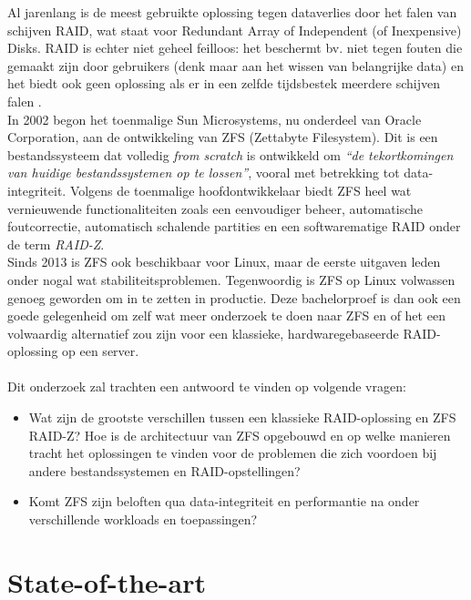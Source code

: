 \documentclass[fleqn,10pt]{voorstel}
\begin{document}
Al jarenlang is de meest gebruikte oplossing tegen dataverlies door het falen van schijven  RAID, wat staat voor Redundant Array of Independent (of Inexpensive) Disks. RAID is echter niet geheel feilloos: het beschermt bv. niet tegen fouten die gemaakt zijn door gebruikers (denk maar aan het wissen van belangrijke data) en het biedt ook geen oplossing als er in een zelfde tijdsbestek meerdere schijven falen \autocite{PeterM.Chen1993}. \\
In 2002 begon het toenmalige Sun Microsystems, nu onderdeel van Oracle Corporation, aan de ontwikkeling van ZFS (Zettabyte Filesystem). Dit is een bestandssysteem dat volledig \textit{from scratch} is ontwikkeld om \textit{``de tekortkomingen van huidige bestandssystemen op te lossen''}\autocite{JeffBonwick_lastZFS}, vooral met betrekking tot data-integriteit. Volgens de toenmalige hoofdontwikkelaar \textcite{ZFSBonwick} biedt ZFS heel wat vernieuwende functionaliteiten zoals een eenvoudiger beheer, automatische foutcorrectie, automatisch schalende partities en een softwarematige RAID onder de term \textit{RAID-Z}. \\
Sinds 2013 is ZFS ook beschikbaar voor Linux, maar de eerste uitgaven leden onder nogal wat stabiliteitsproblemen. Tegenwoordig is ZFS op Linux volwassen genoeg geworden om in te zetten in productie. Deze bachelorproef is dan ook een goede gelegenheid om zelf wat meer onderzoek te doen naar ZFS en of het een volwaardig alternatief zou zijn voor een klassieke, hardwaregebaseerde RAID-oplossing op een server. \\ \\
Dit onderzoek zal trachten een antwoord te vinden op volgende vragen:
\begin{itemize}
\item{Wat zijn de grootste verschillen tussen een klassieke RAID-oplossing en ZFS RAID-Z? Hoe is de architectuur van ZFS opgebouwd en op welke manieren tracht het oplossingen te vinden voor de problemen die zich voordoen bij andere bestandssystemen en RAID-opstellingen?}
  \item{Komt ZFS zijn beloften qua data-integriteit en performantie na onder verschillende workloads en toepassingen?}
\end{itemize}


\section{State-of-the-art}
\label{sec:state-of-the-art}
\end{document}
